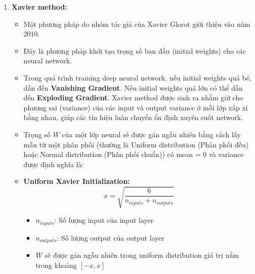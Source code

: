 \documentclass[12pt, a4paper, oneside]{book}
\theoremstyle{plain}
\numberwithin{equation}{chapter} \DeclareMathOperator{\Var}{var}
\begin{document}
\begin{enumerate}
    \item \textbf{Xavier method:}
    \begin{itemize}
        \item[+] Một phương pháp do nhóm tác giả của Xavier Glorot giới thiệu vào năm 2010.
        \item[+] Đây là phương pháp khởi tạo trọng số ban đầu (initial weights) cho các neural network.
        \item[+] Trong quá trình training deep neural network, nếu initial weights quá bé, dẫn đến \textbf{Vanishing Gradient}. Nếu initial weights quá lớn có thể dẫn đến \textbf{Exploding Gradient}. Xavier method được sinh ra nhằm giữ cho phương sai (variance) của các input và output variance ở mỗi lớp xấp xỉ bằng nhau, giúp các tín hiệu luân chuyển ổn định xuyên suốt network.
        \item[+] Trọng số \(W\) của một lớp neural sẽ được gán ngẫu nhiên bằng cách lấy mẫu từ một phân phối (thường là Uniform distribution (Phân phối đều) hoặc Normal distribution (Phân phối chuẩn)) có mean = 0 và variance được định nghĩa là:
        \item[+] \textbf{Uniform Xavier Initialization:}
        \begin{equation}
            x = \sqrt{\frac{6}{n_{inputs} + n_{outputs}}}
        \end{equation} 
        \begin{itemize}
            \item \(n_{inputs}\): Số lượng input của input layer
            \item \(n_{outputs}\): Số lượng output của output layer
            \item \(W\) sẽ được gán ngẫu nhiên trong uniform distribution giá trị nằm trong khoảng \([-x, x]\)
        \end{itemize}
        

\end{itemize}
\end{enumerate}
\end{document}
